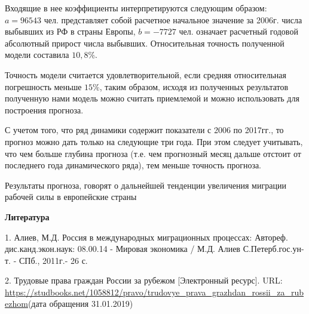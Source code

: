 \documentclass{article}
\begin{document}
Входящие в нее коэффициенты интерпретируются следующим образом: $a=96543$ чел. представляет собой расчетное начальное значение за 2006г. числа выбывших из РФ в страны Европы, $b=-7727$ чел. означает расчетный годовой абсолютный прирост числа выбывших. Относительная точность полученной модели составила $10,8 \%$.

Точность модели считается удовлетворительной, если средняя относительная погрешность меньше $15 \%$, таким образом, исходя из полученных результатов полученную нами модель можно считать приемлемой и можно использовать для построения прогноза.

С учетом того, что ряд динамики содержит показатели с 2006 по 2017гг., то прогноз можно дать только на следующие три года. При этом следует учитывать, что чем больше глубина прогноза (т.е. чем прогнозный месяц дальше отстоит от последнего года динамического ряда), тем меньше точность прогноза.

Результаты прогноза, говорят о дальнейшей тенденции увеличения миграции рабочей силы в европейские страны
\begin{center}
{\textbf{Литература}}
\end{center}

1. Алиев, М.Д. Россия в международных миграционных процессах: Автореф. дис.канд.экон.наук: 08.00.14 - Мировая экономика / М.Д. Алиев С.Петерб.гос.ун-т. - СПб., 2011г.- 26 с.

2. Трудовые права граждан России за рубежом [Электронный ресурс]. URL: \url{https://studbooks.net/1058812/pravo/trudovye_prava_grazhdan_rossii_za_rubezhom}(дата обращения 31.01.2019)
\end{document}

